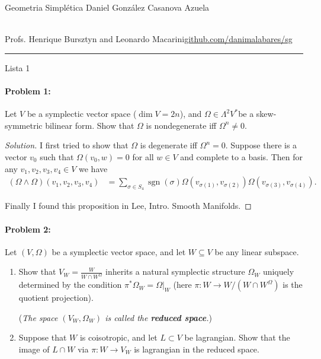 




\begin{minipage}{\textwidth}
	\begin{minipage}{1\textwidth}
		Geometria Simpl\'etica \hfill Daniel González Casanova Azuela
		
		{\small \\Profs. Henrique Bursztyn and Leonardo Macarini\hfill\href{https://github.com/danimalabares/sg}{github.com/danimalabares/sg}}
	\end{minipage}
\end{minipage}\vspace{.2cm}\hrule

\vspace{10pt}
{\huge Lista 1}


\paragraph{Problem 1:} Let $V$ be a symplectic vector space ($\dim V=2n$), and $\Omega\in \Lambda^{2} V^{*}$be a skew-symmetric bilinear form. Show that $\Omega$ is nondegenerate iff $\Omega^{n} \neq 0$.

\begin{proof}[Solution]
	I first tried to show that $\Omega$ is degenerate iff $\Omega^{n}=0$. Suppose there is a vector $v_0$ such that $\Omega( v_0,w)=0$ for all $w\in V$ and complete to a basis. Then for any $v_1,v_2,v_3,v_4\in V$ we have
	 \begin{align*}
		 (\Omega\wedge \Omega)(v_1,v_2,v_3,v_4)&=\sum_{\sigma\in S_{4}}\operatorname{s gn}(\sigma)\Omega(v_{\sigma(1)},v_{\sigma(2)})\Omega(v_{\sigma(3)},v_{\sigma(4)}).
		 \end{align*}

		 Finally I found this proposition in Lee, Intro. Smooth Manifolds.
\end{proof}

\paragraph{Problem 2:} Let $(V,\Omega)$ be a symplectic vector space, and let $W\subseteq V$ be any linear subspace.
\begin{enumerate}[label=\alph*.]
	\item Show that $V_{W}=\frac{W}{W\cap W^{\Omega}}$ inherits a natural symplectic structure $\Omega_{W}$ uniquely determined by the condition $\pi^{*} \Omega_{W}=\Omega|_{W}$ (here $\pi:W\to W/(W\cap W^{\Omega}) $ is the quotient projection).
	
		(\textit{The space $(V_{W},\Omega_{W})$ is called the \textbf{reduced space}.})

	\item Suppose that $W$ is coisotropic, and let $L\subset V$ be lagrangian. Show that the image of $L\cap W$ via $\pi:W\to V_{W}$ is lagrangian in the reduced space.
\end{enumerate}

